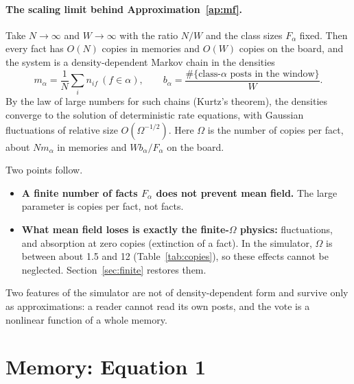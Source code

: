 \documentclass[10pt,a4paper]{article}
\theoremstyle{definition}
\begin{document}
\paragraph{The scaling limit behind Approximation~\ref{ap:mf}.} Take $N\to\infty$ and $W\to\infty$ with the ratio $N/W$
and the class sizes $F_\alpha$ fixed. Then every fact has $O(N)$ copies in memories and $O(W)$ copies on the board, and
the system is a density-dependent Markov chain in the densities
\begin{equation}
m_\alpha=\frac{1}{N}\sum_i n_{if}\ (f\in\alpha),\qquad b_\alpha=\frac{\#\{\text{class-}\alpha\text{ posts in the window}\}}{W}.
\end{equation}
By the law of large numbers for such chains (Kurtz's theorem), the densities converge to the solution of deterministic
rate equations, with Gaussian fluctuations of relative size $O(\Omega^{-1/2})$. Here $\Omega$ is the number of copies per
fact, about $N m_\alpha$ in memories and $W b_\alpha/F_\alpha$ on the board.

Two points follow.
\begin{itemize}
\item \textbf{A finite number of facts $F_\alpha$ does not prevent mean field.} The large parameter is copies per fact,
  not facts.
\item \textbf{What mean field loses is exactly the finite-$\Omega$ physics:} fluctuations, and absorption at zero copies
  (extinction of a fact). In the simulator, $\Omega$ is between about 1.5 and 12 (Table~\ref{tab:copies}), so these
  effects cannot be neglected. Section~\ref{sec:finite} restores them.
\end{itemize}
Two features of the simulator are not of density-dependent form and survive only as approximations: a reader cannot
read its own posts, and the vote is a nonlinear function of a whole memory.

\section{Memory: Equation 1}
\label{sec:memory}
\end{document}
